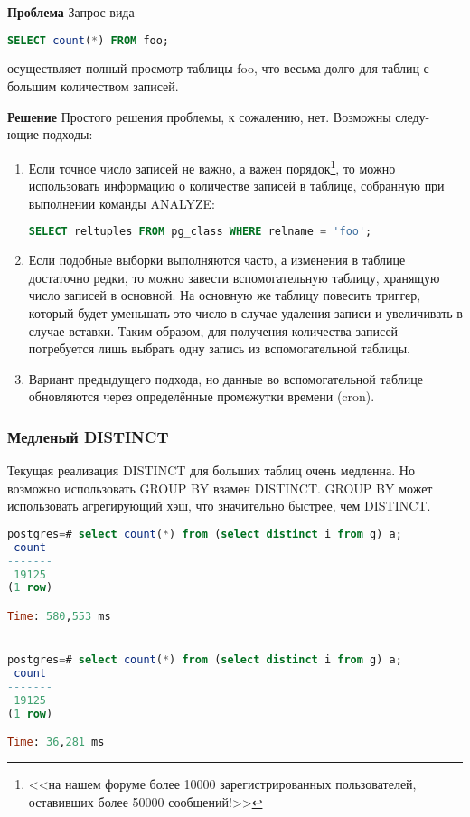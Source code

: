 \textbf{Проблема} Запрос вида
\begin{lstlisting}[language=SQL,label=lst:sql_performance1,caption=SQL]
SELECT count(*) FROM foo;
\end{lstlisting}
осуществляет полный просмотр таблицы foo, что весьма долго для таблиц с большим количеством записей.

\textbf{Решение} Простого решения проблемы, к сожалению, нет. Возможны следу-
ющие подходы:
\begin{enumerate}
\item Если точное число записей не важно, а важен порядок\footnote{<<на нашем форуме более 10000 зарегистрированных 
пользователей, оставивших более 50000 сообщений!>>}, то можно использовать информацию о количестве 
записей в таблице, собранную при выполнении команды ANALYZE:
\begin{lstlisting}[language=SQL,label=lst:sql_performance2,caption=SQL]
SELECT reltuples FROM pg_class WHERE relname = 'foo';
\end{lstlisting}
\item Если подобные выборки выполняются часто, а изменения в таблице достаточно редки, то можно завести вспомогательную 
таблицу, хранящую число записей в основной. На основную же таблицу повесить триггер, который будет уменьшать это число 
в случае удаления записи и увеличивать в случае вставки. Таким образом, для получения количества записей потребуется лишь 
выбрать одну запись из вспомогательной таблицы.
\item Вариант предыдущего подхода, но данные во вспомогательной таблице обновляются через определённые промежутки времени (cron).
\end{enumerate}

\subsubsection{Медленый DISTINCT}
Текущая реализация DISTINCT для больших таблиц очень медленна. Но возможно использовать GROUP BY взамен DISTINCT. 
GROUP BY может использовать агрегирующий хэш, что значительно быстрее, чем DISTINCT.

\begin{lstlisting}[language=SQL,label=lst:sql_performance3,caption=DISTINCT]
postgres=# select count(*) from (select distinct i from g) a;
 count 
-------
 19125
(1 row)

Time: 580,553 ms


postgres=# select count(*) from (select distinct i from g) a;
 count 
-------
 19125
(1 row)

Time: 36,281 ms
\end{lstlisting}

